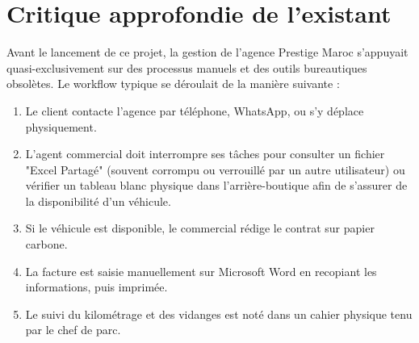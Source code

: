 \documentclass[12pt, a4paper]{report}
\begin{document}
\section{Critique approfondie de l'existant}
Avant le lancement de ce projet, la gestion de l'agence Prestige Maroc s'appuyait quasi-exclusivement sur des processus manuels et des outils bureautiques obsolètes. Le workflow typique se déroulait de la manière suivante :
\begin{enumerate}
    \item Le client contacte l'agence par téléphone, WhatsApp, ou s'y déplace physiquement.
    \item L'agent commercial doit interrompre ses tâches pour consulter un fichier "Excel Partagé" (souvent corrompu ou verrouillé par un autre utilisateur) ou vérifier un tableau blanc physique dans l'arrière-boutique afin de s'assurer de la disponibilité d'un véhicule.
    \item Si le véhicule est disponible, le commercial rédige le contrat sur papier carbone.
    \item La facture est saisie manuellement sur Microsoft Word en recopiant les informations, puis imprimée.
    \item Le suivi du kilométrage et des vidanges est noté dans un cahier physique tenu par le chef de parc.
\end{enumerate}
\end{document}
